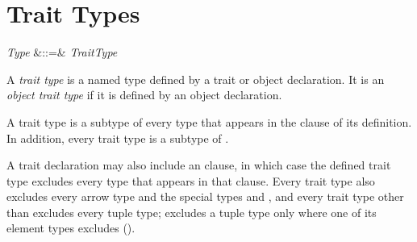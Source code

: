 \section{Trait Types}

\begin{Grammar}
\emph{Type} &::=& \emph{TraitType} \\
\end{Grammar}

A \emph{trait type} is a named type defined by a trait or object declaration.
It is an \emph{object trait type}
if it is defined by an object declaration.

A trait type is a subtype of every type
that appears in the  clause of its definition.
In addition, every trait type is a subtype of .

A trait declaration may also include an  clause,
in which case the defined trait type
excludes every type that appears in that clause.
Every trait type also excludes every arrow type
and the special types \TYP{()} and ,
and every trait type other than  excludes every tuple type;
 excludes a tuple type only where one of its element types
excludes  ().

